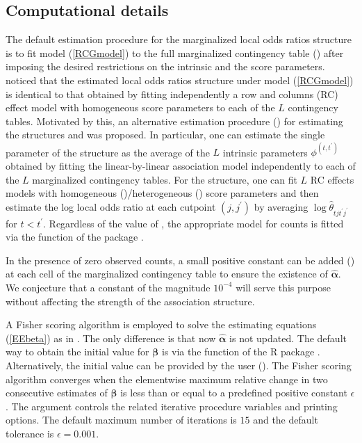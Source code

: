 \documentclass[article,shortnames,nojss]{jss}
\begin{document}
\subsection{Computational details} 
The default estimation procedure for the marginalized local odds ratios structure is to fit model (\ref{RCGmodel}) to the full marginalized contingency table () after imposing the desired restrictions on the intrinsic and the score parameters. \cite{Touloumis2011a} noticed that the estimated local odds ratios structure under model (\ref{RCGmodel}) is identical to that obtained by fitting independently a row and columns (RC) effect model \citep{Goodman1985} with homogeneous score parameters to each of the $L$ contingency tables. Motivated by this, an alternative estimation procedure () for estimating the structures  and  was proposed. In particular, one can estimate the single parameter of the  structure as the average of the $L$ intrinsic parameters $\phi^{(t,t^{\prime})}$ obtained by fitting the linear-by-linear association model \citep{Agresti2002} independently to each of the $L$ marginalized contingency tables. For the  structure, one can fit $L$ RC effects models with homogeneous ()/heterogeneous () score parameters and then estimate the log local odds ratio at each cutpoint $(j,j^{\prime})$ by averaging $\log \hat{\theta}_{tjt^{\prime}j^{\prime}}$ for $t<t^{\prime}$. Regardless of the value of , the appropriate model for counts is fitted via the function  of the  package  \citep{Turner2012}.

In the presence of zero observed counts, a small positive constant can be added () at each cell of the marginalized contingency table to ensure the existence of $\widehat{\boldsymbol \alpha}$. We conjecture that a constant of the magnitude $10^{-4}$ will serve this purpose without affecting the strength of the association structure. 

A Fisher scoring algorithm is employed to solve the estimating equations (\ref{EEbeta}) as in \cite{Lipsitz1994}. The only difference is that now $\widehat{\boldsymbol{\alpha}}$ is not updated. The default way to obtain the initial value for $\boldsymbol \beta$ is via the function  of the R package  \citep{Yee2010}. Alternatively, the initial value can be provided by the user (). The Fisher scoring algorithm converges when the elementwise maximum relative change in two consecutive estimates of $\boldsymbol \beta$ is less than or equal to a predefined positive constant $\epsilon$. The  argument controls the related iterative procedure variables and printing options. The default maximum number of iterations is $15$ and the default tolerance is $\epsilon=0.001$.
   
\end{document}
